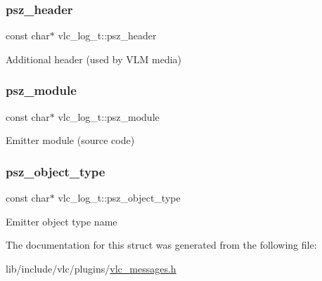 \subsubsection{\texorpdfstring{psz\+\_\+header}{psz\_header}}
{\footnotesize\ttfamily const char$\ast$ vlc\+\_\+log\+\_\+t\+::psz\+\_\+header}

Additional header (used by V\+LM media) \mbox{\label{structvlc__log__t_a2c73720e584b561a452c897191234173}} 
\subsubsection{\texorpdfstring{psz\+\_\+module}{psz\_module}}
{\footnotesize\ttfamily const char$\ast$ vlc\+\_\+log\+\_\+t\+::psz\+\_\+module}

Emitter module (source code) \mbox{\label{structvlc__log__t_aea2aa755a9ed0c56e001652408b16408}} 
\subsubsection{\texorpdfstring{psz\+\_\+object\+\_\+type}{psz\_object\_type}}
{\footnotesize\ttfamily const char$\ast$ vlc\+\_\+log\+\_\+t\+::psz\+\_\+object\+\_\+type}

Emitter object type name 

The documentation for this struct was generated from the following file\+:\begin{DoxyCompactItemize}
\item 
lib/include/vlc/plugins/\hyperlink{vlc__messages_8h}{vlc\+\_\+messages.\+h}\end{DoxyCompactItemize}
